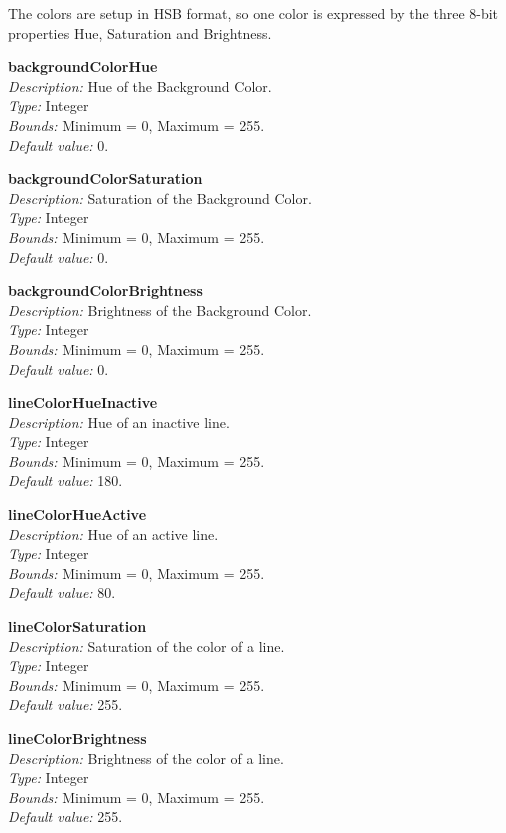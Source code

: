 \documentclass[12pt,a4paper,titlepage,oneside]{report}
\begin{document}
The colors are setup in HSB format, so one color is expressed by the three 8-bit properties Hue, Saturation and Brightness.

\noindent
\textbf{backgroundColorHue} \\
\textit{Description:} Hue of the Background Color. \\
\textit{Type:} Integer \\
\textit{Bounds:} Minimum = 0, Maximum = 255. \\
\textit{Default value:} 0.

\noindent
\textbf{backgroundColorSaturation} \\
\textit{Description:} Saturation of the Background Color. \\
\textit{Type:} Integer \\
\textit{Bounds:} Minimum = 0, Maximum = 255. \\
\textit{Default value:} 0.

\noindent
\textbf{backgroundColorBrightness} \\
\textit{Description:} Brightness of the Background Color. \\
\textit{Type:} Integer \\
\textit{Bounds:} Minimum = 0, Maximum = 255. \\
\textit{Default value:} 0.

\noindent
\textbf{lineColorHueInactive} \\
\textit{Description:} Hue of an inactive line. \\
\textit{Type:} Integer \\
\textit{Bounds:} Minimum = 0, Maximum = 255. \\
\textit{Default value:} 180.

\noindent
\textbf{lineColorHueActive} \\
\textit{Description:} Hue of an active line. \\
\textit{Type:} Integer \\
\textit{Bounds:} Minimum = 0, Maximum = 255. \\
\textit{Default value:} 80.

\noindent
\textbf{lineColorSaturation} \\
\textit{Description:} Saturation of the color of a line. \\
\textit{Type:} Integer \\
\textit{Bounds:} Minimum = 0, Maximum = 255. \\
\textit{Default value:} 255.

\noindent
\textbf{lineColorBrightness} \\
\textit{Description:} Brightness of the color of a line. \\
\textit{Type:} Integer \\
\textit{Bounds:} Minimum = 0, Maximum = 255. \\
\textit{Default value:} 255.
\end{document}
